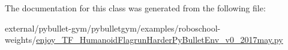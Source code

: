 The documentation for this class was generated from the following file\+:\begin{DoxyCompactItemize}
\item 
external/pybullet-\/gym/pybulletgym/examples/roboschool-\/weights/\hyperlink{enjoy___t_f___humanoid_flagrun_harder_py_bullet_env__v0__2017may_8py}{enjoy\+\_\+\+T\+F\+\_\+\+Humanoid\+Flagrun\+Harder\+Py\+Bullet\+Env\+\_\+v0\+\_\+2017may.\+py}\end{DoxyCompactItemize}
